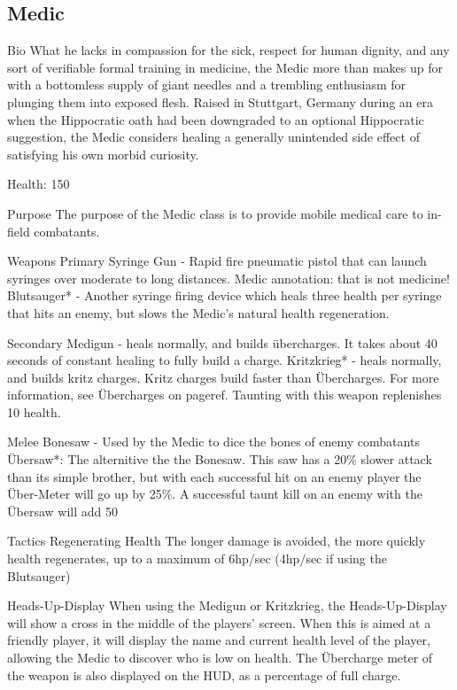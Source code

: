 \subsection{Medic}
Bio
What he lacks in compassion for the sick, respect for human dignity, and any sort of verifiable formal training in medicine, the Medic more than makes up for with a bottomless supply of giant needles and a trembling enthusiasm for plunging them into exposed flesh. Raised in Stuttgart, Germany during an era when the Hippocratic oath had been downgraded to an optional Hippocratic suggestion, the Medic considers healing a generally unintended side effect of satisfying his own morbid curiosity.

Health: 150

Purpose
The purpose of the Medic class is to provide mobile medical care to in-field combatants.  

Weapons 
Primary
Syringe Gun - Rapid fire pneumatic pistol that can launch syringes over moderate to long distances.  {{Medic annotation: that is not medicine!}}
Blutsauger* - Another syringe firing device which heals three health per syringe that hits an enemy, but slows the Medic's natural health regeneration. 

Secondary
Medigun - heals normally, and builds übercharges.  It takes about 40 seconds of constant healing to fully build a charge.
Kritzkrieg* - heals normally, and builds kritz charges.  Kritz charges build faster than Übercharges.  For more information, see Übercharges on {{pageref}}.  Taunting with this weapon replenishes 10 health.

Melee
Bonesaw - Used by the Medic to dice the bones of enemy combatants
Übersaw*: The alternitive the the Bonesaw. This saw has a 20\% slower attack than its simple brother, but with each successful hit on an enemy player the Über-Meter will go up by 25\%. A successful taunt kill on an enemy with the Übersaw will add 50%

Tactics
Regenerating Health
The longer damage is avoided, the more quickly health regenerates, up to a maximum of 6hp/sec (4hp/sec if using the Blutsauger)

Heads-Up-Display 
When using the Medigun or Kritzkrieg, the Heads-Up-Display will show a cross in the middle of the players' screen. When this is aimed at a friendly player, it will display the name and current health level of the player, allowing the Medic to discover who is low on health. The Übercharge meter of the weapon is also displayed on the HUD, as a percentage of full charge.

